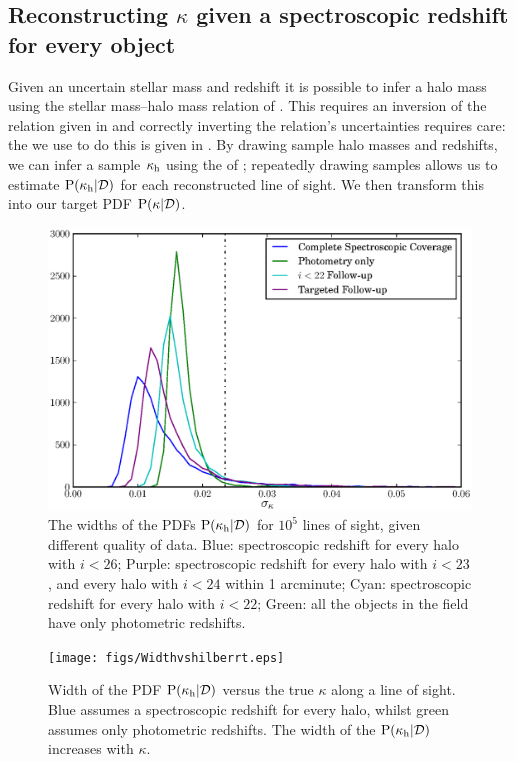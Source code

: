 \documentclass[useAMS,usenatbib]{mn2e}
\begin{document}
\subsection{Reconstructing $\kappa$ given a spectroscopic redshift for every object}

Given an uncertain stellar mass and redshift it is possible to infer a
halo mass using the stellar mass--halo mass relation of
\citet{BehrooziEtal2010}. This \proceedure requires an inversion of the
relation given in \citet{BehrooziEtal2010} and correctly inverting the
relation's uncertainties requires care: the \proceedure we use to do this
is given in . By drawing sample halo masses
and redshifts, we can infer a sample $\kappa_{\rm h}$ using the \proceedure of
; repeatedly drawing samples allows us to
estimate ${\rm P}(\kappa_{\rm h}|{\mathcal{D}})$ for each reconstructed line of sight. We then
transform this into our target PDF ${\rm P}(\kappa|{\mathcal{D}})$.

\begin{figure}
\includegraphics[width=\columnwidth]{figs/Width.eps}
\caption{The widths of the \infered PDFs ${\rm P}(\kappa_{\rm h}|{\mathcal{D}})$ for
$10^5$ lines of sight, given different quality of data. Blue:
spectroscopic redshift for every halo with $i<26$; Purple: 
spectroscopic redshift for every halo with $i<23$, and every halo with $i<24$
within 1 arcminute; Cyan: spectroscopic redshift for every halo with $i<22$; 
Green: all the objects in the field have only photometric redshifts.}
\label{fig:reconwidths}
\end{figure}

\begin{figure}
\texttt{[image: figs/Widthvshilberrt.eps]}
\caption{Width of the \infered PDF ${\rm P}(\kappa_{\rm h}|{\mathcal{D}})$ versus the true
$\kappa$ along a line of sight. Blue assumes a spectroscopic redshift for
every halo, whilst green assumes only photometric redshifts. The width of the
\infered ${\rm P}(\kappa_{\rm h}|{\mathcal{D}})$ increases with $\kappa$. 
}
\label{fig:widthsvsH}
\end{figure}
\end{document}
